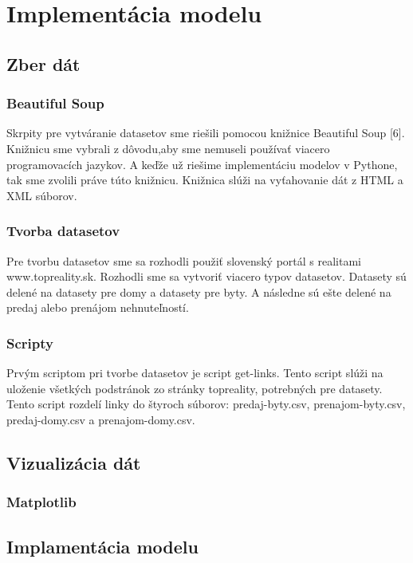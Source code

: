
\chapter{Implementácia modelu}


\section{Zber dát}
\subsection{Beautiful Soup}
Skrpity pre vytváranie datasetov sme riešili pomocou knižnice Beautiful Soup [6]. Knižnicu sme vybrali z dôvodu,aby sme nemuseli používať viacero programovacích jazykov. A keďže už riešime implementáciu modelov v Pythone, tak sme zvolili práve túto knižnicu. Knižnica slúži na vyťahovanie dát z HTML a XML súborov.

\subsection{Tvorba datasetov}
Pre tvorbu datasetov sme sa rozhodli použiť slovenský portál s realitami www.topreality.sk. Rozhodli sme sa vytvoriť viacero typov datasetov. Datasety sú delené na datasety pre domy a datasety pre byty. A následne sú ešte delené na predaj alebo prenájom nehnuteľností.


\subsection{Scripty}
Prvým scriptom pri tvorbe datasetov je script get-links. Tento script slúži na uloženie všetkých podstránok zo stránky topreality, potrebných pre datasety. Tento script rozdelí linky do štyroch súborov: predaj-byty.csv, prenajom-byty.csv, predaj-domy.csv a prenajom-domy.csv.

\section{Vizualizácia dát}
\subsection{Matplotlib}

\section{Implamentácia modelu}
